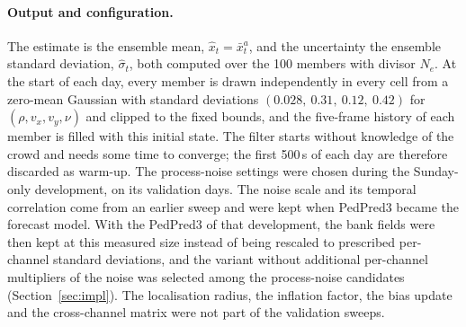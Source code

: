 \documentclass[english, 12pt, a4paper, elec, utf8, a-2b, online]{aaltothesis}
\begin{document}
\paragraph{Output and configuration.}
The estimate is the ensemble mean, $\hat{x}_t = \bar{x}^a_t$, and the
uncertainty the ensemble standard deviation, $\hat{\sigma}_t$, both computed over
the 100 members with divisor $N_e$. At the start of each day, every member is
drawn independently in every cell from a zero-mean Gaussian with standard
deviations $(0.028,\ 0.31,\ 0.12,\ 0.42)$ for $(\rho, v_x, v_y, \nu)$ and
clipped to the fixed bounds, and the five-frame history of each member is
filled with this initial state. The filter starts without knowledge of
the crowd and needs some time to converge; the first 500\,s of each day are therefore
discarded as warm-up. The process-noise settings were chosen during the Sunday-only
development, on its validation days. The noise scale and its temporal
correlation come from an earlier sweep and were kept when PedPred3 became the
forecast model. With the PedPred3 of that development, the bank fields were then
kept at this measured size instead of being rescaled to prescribed per-channel
standard deviations, and the variant without additional per-channel
multipliers of the noise was selected among the process-noise candidates (Section~\ref{sec:impl}). The
localisation radius, the inflation factor, the bias update and the
cross-channel matrix were not part of the validation sweeps.
\end{document}
